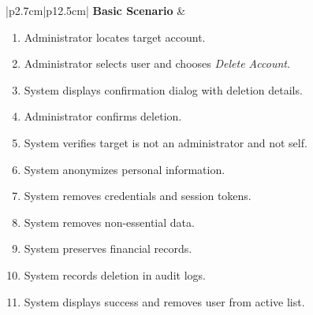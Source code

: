 \begin{table}[H]
\begin{tabular}{|p{2.7cm}|p{12.5cm}|}
        \textbf{Basic Scenario} & \begin{minipage}[t]{\linewidth}
                                      \begin{enumerate}[topsep=0pt,itemsep=1pt,parsep=0pt,partopsep=0pt]
                                          \item Administrator locates target account.
                                          \item Administrator selects user and chooses \textit{Delete Account}.
                                          \item System displays confirmation dialog with deletion details.
                                          \item Administrator confirms deletion.
                                          \item System verifies target is not an administrator and not self.
                                          \item System anonymizes personal information.
                                          \item System removes credentials and session tokens.
                                          \item System removes non-essential data.
                                          \item System preserves financial records.
                                          \item System records deletion in audit logs.
                                          \item System displays success and removes user from active list.
                                      \end{enumerate}
                                  \end{minipage} \\\hline
        

\end{tabular}
\end{table}
